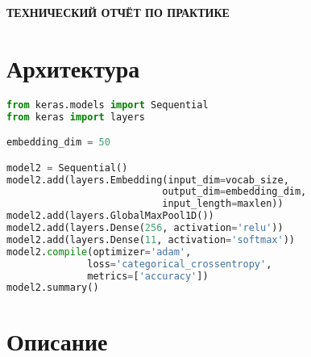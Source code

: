 \begin{center}
\bfseries{\large ТЕХНИЧЕСКИЙ ОТЧЁТ ПО ПРАКТИКЕ}
\end{center}

\section*{Архитектура}
\begin{lstlisting}[language=Python]
from keras.models import Sequential
from keras import layers

embedding_dim = 50

model2 = Sequential()
model2.add(layers.Embedding(input_dim=vocab_size, 
                           output_dim=embedding_dim, 
                           input_length=maxlen))
model2.add(layers.GlobalMaxPool1D())
model2.add(layers.Dense(256, activation='relu'))
model2.add(layers.Dense(11, activation='softmax'))
model2.compile(optimizer='adam',
              loss='categorical_crossentropy',
              metrics=['accuracy'])
model2.summary()
\end{lstlisting}
\section*{Описание}

